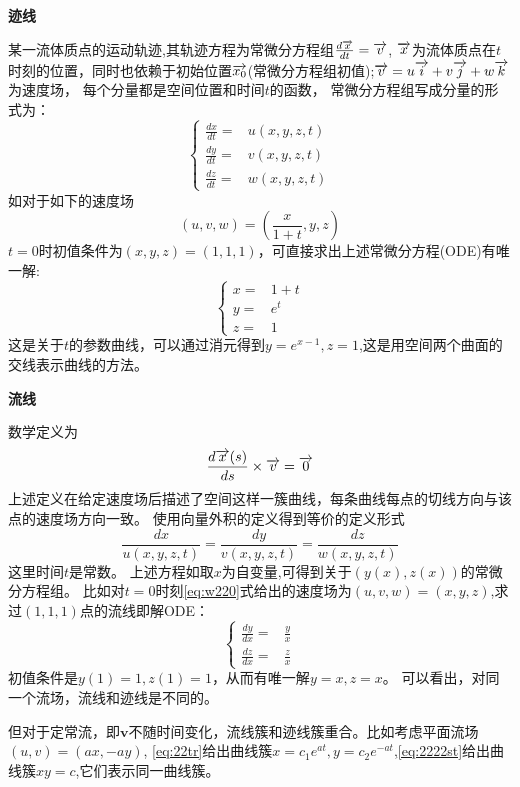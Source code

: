 \textbf{迹线}

某一流体质点的运动轨迹,其轨迹方程为常微分方程组$\frac{d \overrightarrow{x}}{d t}=\overrightarrow{v}$,
$\overrightarrow{x}$为流体质点在$t$时刻的位置，同时也依赖于初始位置$\overrightarrow{x_0}$(常微分方程组初值);$\overrightarrow{v}=u\overrightarrow{i}+v\overrightarrow{j}+w\overrightarrow{k}$为速度场，
每个分量都是空间位置和时间$t$的函数，
常微分方程组写成分量的形式为：
\begin{equation}\label{eq:22tr}
\begin{cases}
\frac{dx}{dt}=&u(x,y,z,t)\\
\frac{dy}{dt}=&v(x,y,z,t)\\
\frac{dz}{dt}=&w(x,y,z,t)
\end{cases}
\end{equation}
如对于如下的速度场
\begin{equation}\label{eq:w220}
(u,v,w)=(\frac{x}{1+t},y,z)
\end{equation}
$t=0$时初值条件为$(x,y,z)=(1,1,1)$，可直接求出上述常微分方程(ODE)有唯一解:
\begin{equation}
\begin{cases}
x=&1+t\\
y=&e^t\\
z=&1
\end{cases}
\end{equation}
这是关于$t$的参数曲线，可以通过消元得到$y=e^{x-1},z=1$,这是用空间两个曲面的交线表示曲线的方法。

\textbf{流线}

数学定义为
\begin{equation}
\frac{d \overrightarrow{x}(s)}{d s}\times \overrightarrow{v} =\overrightarrow{0}
\end{equation}
上述定义在给定速度场后描述了空间这样一簇曲线，每条曲线每点的切线方向与该点的速度场方向一致。
使用向量外积的定义得到等价的定义形式
\begin{equation}\label{eq:2222st}
\frac{dx}{u(x,y,z,t)}=\frac{dy}{v(x,y,z,t)}=\frac{dz}{w(x,y,z,t)}
\end{equation}
这里时间$t$是常数。
上述方程如取$x$为自变量,可得到关于$(y(x),z(x))$的常微分方程组。
比如对$t=0$时刻\eqref{eq:w220}式给出的速度场为$(u,v,w)=(x,y,z)$,求过$(1,1,1)$点的流线即解ODE：
\begin{equation}
\begin{cases}
\frac{dy}{dx}=&\frac{y}{x}\\
\frac{dz}{dx}=&\frac{z}{x}
\end{cases}
\end{equation}
初值条件是$y(1)=1,z(1)=1$，从而有唯一解$y=x,z=x$。
可以看出，对同一个流场，流线和迹线是不同的。

但对于定常流，即$\bm{v}$不随时间变化，流线簇和迹线簇重合。比如考虑平面流场$(u,v)=(ax,-ay)$,
\eqref{eq:22tr}给出曲线簇$x=c_1e^{at},y=c_2e^{-at}$,\eqref{eq:2222st}给出曲线簇$xy=c$,它们表示同一曲线簇。

